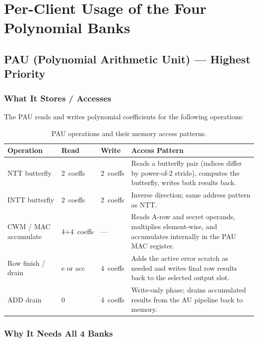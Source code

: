 \documentclass[11pt,letterpaper]{article}
\begin{document}
\section{Per-Client Usage of the Four Polynomial Banks}
\label{sec:clients}

\subsection{PAU (Polynomial Arithmetic Unit) — Highest Priority}

\subsubsection{What It Stores / Accesses}

The PAU reads and writes polynomial coefficients for the following
operations:

\begin{table}[H]
\centering
\caption{PAU operations and their memory access patterns.}
\label{tab:pau_ops}
\begin{tabular}{@{}lllp{5.5cm}@{}}
\toprule
\textbf{Operation} & \textbf{Read} & \textbf{Write} &
\textbf{Access Pattern} \\
\midrule
NTT butterfly & 2~coeffs & 2~coeffs &
  Reads a butterfly pair (indices differ by power-of-2 stride),
  computes the butterfly, writes both results back. \\
INTT butterfly & 2~coeffs & 2~coeffs &
  Inverse direction; same address pattern as NTT. \\
CWM / MAC accumulate & 4+4~coeffs & --- &
  Reads A-row and secret operands, multiplies element-wise,
  and accumulates internally in the PAU MAC register. \\
Row finish / drain & e or acc & 4~coeffs &
  Adds the active error scratch as needed and writes final row
  results back to the selected output slot. \\
ADD drain & 0 & 4~coeffs &
  Write-only phase; drains accumulated results from the AU
  pipeline back to memory. \\
\bottomrule
\end{tabular}
\end{table}

\subsubsection{Why It Needs All 4 Banks}
\end{document}
